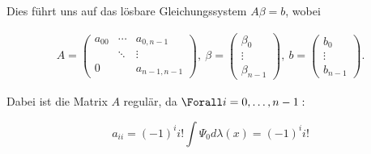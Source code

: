 \begin{solution}
Dies führt uns auf das lösbare Gleichungssystem $A \beta = b$, wobei

\begin{align*}
  A =
  \begin{pmatrix}
    a_{00} & \cdots & a_{0, n-1}   \\
           & \ddots & \vdots       \\
    0      &        & a_{n-1, n-1}
  \end{pmatrix}, \:
  \beta =
  \begin{pmatrix}
  \beta_0 \\
  \vdots  \\
  \beta_{n-1}
  \end{pmatrix}, \:
  b =
  \begin{pmatrix}
    b_0    \\
    \vdots \\
    b_{n-1}
  \end{pmatrix}.
\end{align*}

 Dabei ist die Matrix $A$ regulär, da $\Forall i = 0, \ldots, n-1:$

 \begin{equation*}
   a_{ii} = (-1)^ii!\int\Psi_0 d\lambda(x) = (-1)^ii!
 \end{equation*}

\end{solution}
